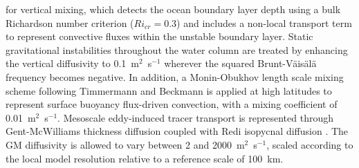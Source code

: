 \documentclass[pdflatex,sn-nature]{sn-jnl}
\begin{document}
  \cite{large1994oceanic} for vertical mixing, which detects the ocean boundary
  layer depth using a bulk Richardson number criterion ($Ri_{cr} = 0.3$) and
  includes a non-local transport term to represent convective fluxes within the
  unstable boundary layer. Static gravitational instabilities throughout the water
  column are treated by enhancing the vertical diffusivity to 0.1~m$^2$~s$^{-1}$
  wherever the squared Brunt-V\"{a}is\"{a}l\"{a} frequency becomes negative.
  In addition, a Monin-Obukhov length scale mixing scheme following Timmermann and Beckmann
  \cite{timmermann2004parameterization} is applied at high latitudes to represent
  surface buoyancy flux-driven convection, with a mixing coefficient of
  0.01~m$^2$~s$^{-1}$. Mesoscale eddy-induced tracer transport is represented through
  Gent-McWilliams thickness diffusion \cite{gent1990isopycnal,ferrari2008parameterization}
  coupled with Redi isopycnal diffusion \cite{redi1982oceanic}.  The GM diffusivity
  is allowed to vary between 2 and 2000~m$^2$~s$^{-1}$, scaled according to the
  local model resolution relative to a reference scale of 100~km.
\end{document}
